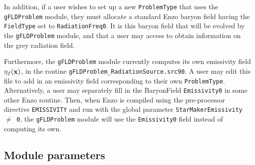 \documentclass[letterpaper,10pt]{article}
\renewcommand{\(}{\left(}
\renewcommand{\)}{\right)}
\newcommand{\xvec}{{\bf x}}
\begin{document}
In addition, if a user wishes to set up a new {\tt ProblemType} that
uses the {\tt gFLDProblem} module, they must allocate a standard Enzo
baryon field having the {\tt FieldType} set to {\tt RadiationFreq0}.
It is this baryon field that will be evolved by the {\tt gFLDProblem}
module, and that a user may access to obtain information on the
grey radiation field. 

Furthermore, the {\tt gFLDProblem} module currently computes its own
emissivity field $\eta_f(\xvec)$, in the routine 
{\tt gFLDProblem\_RadiationSource.src90}.  A user may edit this file
to add in an emissivity field corresponding to their own 
{\tt ProblemType}.  Alternatively, a user may separately fill in the
BaryonField {\tt Emissivity0} in some other Enzo routine.  Then, when
Enzo is compiled using the pre-processor directive {\tt EMISSIVITY}
and run with the global parameter {\tt StarMakerEmissivity $\ne$ 0},
the {\tt gFLDProblem} module will use the {\tt Emissivity0} field
instead of computing its own. 



\subsection{Module parameters}
\end{document}
